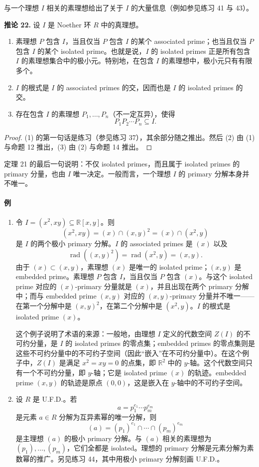 与一个理想 $I$ 相关的素理想给出了关于 $I$ 的大量信息（例如参见练习 41 与 43）。

\noindent\textbf{推论 22.} 设 $I$ 是 Noether 环 $R$ 中的真理想。
\begin{enumerate}[label=(\arabic*)]
	\item 素理想 $P$ 包含 $I$，当且仅当 $P$ 包含 $I$ 的某个 associated prime；也当且仅当 $P$ 包含 $I$ 的某个 isolated prime。也就是说，$I$ 的 isolated primes 正是所有包含 $I$ 的素理想集合中的极小元。特别地，在包含 $I$ 的素理想中，极小元只有有限多个。
	\item $I$ 的根式是 $I$ 的 associated primes 的交，因而也是 $I$ 的 isolated primes 的交。
	\item 存在包含 $I$ 的素理想 $P_1,
	\ldots,P_n$（不一定互异），使得
	\[
	P_1P_2\cdots P_n\subseteq I.
	\]
\end{enumerate}

\begin{proof}
	(1) 的第一句话是练习（参见练习 37），其余部分随之推出。然后 (2) 由 (1) 与命题 12 推出，(3) 由 (2) 与命题 14 推出。
\end{proof}

定理 21 的最后一句说明：不仅 isolated primes，而且属于 isolated primes 的 primary 分量，也由 $I$ 唯一决定。一般而言，一个理想 $I$ 的 primary 分解本身并不唯一。

\paragraph{例}
\begin{enumerate}[label=(\arabic*)]
	\item 令 $I=(x^2,xy)\subseteq\mathbb R[x,y]$。则
	\[
	(x^2,xy)=(x)\cap(x,y)^2=(x)\cap(x^2,y)
	\]
	是 $I$ 的两个极小 primary 分解。$I$ 的 associated primes 是 $(x)$ 以及
	\[
	\operatorname{rad}((x,y)^2)=\operatorname{rad}(x^2,y)=(x,y).
	\]
	由于 $(x)\subset(x,y)$，素理想 $(x)$ 是唯一的 isolated prime；$(x,y)$ 是 embedded prime。素理想 $P$ 包含 $I$，当且仅当 $P$ 包含 $(x)$。与这个 isolated prime 对应的 $(x)$-primary 分量就是 $(x)$，并且出现在两个 primary 分解中；而与 embedded prime $(x,y)$ 对应的 $(x,y)$-primary 分量并不唯一——在第一个分解中是 $(x,y)^2$，在第二个分解中是 $(x^2,y)$。$I$ 的根式是 isolated prime $(x)$。
	
	这个例子说明了术语的来源：一般地，由理想 $I$ 定义的代数空间 $Z(I)$ 的不可约分量，是 $I$ 的 isolated primes 的零点集；embedded primes 的零点集则是这些不可约分量中的不可约子空间（因此“嵌入”在不可约分量中）。在这个例子中，$Z(I)$ 是满足 $x^2=xy=0$ 的点集，即 $\mathbb R^2$ 中的 $y$-轴。这个代数空间只有一个不可约分量，即 $y$-轴；它是 isolated prime $(x)$ 的轨迹。embedded prime $(x,y)$ 的轨迹是原点 $(0,0)$，这是嵌入在 $y$-轴中的不可约子空间。
	\item 设 $R$ 是 U.F.D.。若
	\[
	a=p_1^{e_1}\cdots p_m^{e_m}
	\]
	是元素 $a\in R$ 分解为互异素幂的唯一分解，则
	\[
	(a)=(p_1)^{e_1}\cap\cdots\cap(p_m)^{e_m}
	\]
	是主理想 $(a)$ 的极小 primary 分解。与 $(a)$ 相关的素理想为 $(p_1),
	\ldots,(p_m)$，它们全都是 isolated。理想的 primary 分解是元素分解为素数幂的推广。另见练习 44，其中用极小 primary 分解刻画 U.F.D.。
\end{enumerate}


